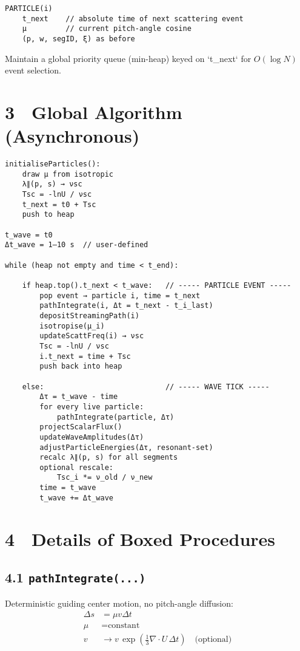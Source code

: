 {\begin{lstlisting}
PARTICLE(i)
    t_next    // absolute time of next scattering event
    μ         // current pitch-angle cosine
    (p, w, segID, ξ) as before
\end{lstlisting}

Maintain a global priority queue (min-heap) keyed on `t_next` for $O(\log N)$ event selection.

\section*{3 Global Algorithm (Asynchronous)}

\begin{lstlisting}
initialiseParticles():
    draw μ from isotropic
    λ∥(p, s) → νsc
    Tsc = -lnU / νsc
    t_next = t0 + Tsc
    push to heap

t_wave = t0
Δt_wave = 1–10 s  // user-defined

while (heap not empty and time < t_end):

    if heap.top().t_next < t_wave:   // ----- PARTICLE EVENT -----
        pop event → particle i, time = t_next
        pathIntegrate(i, Δt = t_next - t_i_last)
        depositStreamingPath(i)
        isotropise(μ_i)
        updateScattFreq(i) → νsc
        Tsc = -lnU / νsc
        i.t_next = time + Tsc
        push back into heap

    else:                            // ----- WAVE TICK -----
        Δτ = t_wave - time
        for every live particle:
            pathIntegrate(particle, Δτ)
        projectScalarFlux()
        updateWaveAmplitudes(Δτ)
        adjustParticleEnergies(Δτ, resonant-set)
        recalc λ∥(p, s) for all segments
        optional rescale:
            Tsc_i *= ν_old / ν_new
        time = t_wave
        t_wave += Δt_wave
\end{lstlisting}

\section*{4 Details of Boxed Procedures}

\subsection*{4.1 \texttt{pathIntegrate(...)}}

Deterministic guiding center motion, no pitch-angle diffusion:
\[
\begin{aligned}
\Delta s &= \mu v \Delta t \\
\mu      &= \text{constant} \\
v        &\rightarrow v\,\exp\left(\frac{1}{3}\nabla \cdot U\,\Delta t\right)\quad\text{(optional)}
\end{aligned}
\]

}

